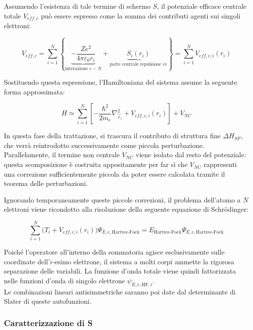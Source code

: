 Assumendo l'esistenza di tale termine di schermo \( S \), il potenziale efficace centrale totale \( V_{eff,c} \) può essere espresso come la somma dei contributi agenti sui singoli elettroni:

\begin{equation}
    V_{eff,c} = \sum_{i=1}^{N} \left\{ \underbrace{-\frac{Ze^2}{4\pi\varepsilon_0 r_i}}_{\text{interazione } e-N} + \underbrace{S_i(r_i)}_{\text{parte centrale repulsione } ee} \right\} = \sum_{i=1}^{N} V_{eff,c,i}(r_i)
\end{equation}

Sostituendo questa espressione, l'Hamiltoniana del sistema assume la seguente forma approssimata:

\begin{equation}
    H \simeq \sum_{i=1}^{N} \left[ -\frac{\hbar^2}{2m_e} \nabla_{\vec{r}_i}^2 + V_{eff,c,i}(r_i) \right] + V_{NC}
\end{equation}

In questa fase della trattazione, si trascura il contributo di struttura fine \( \Delta H_{SF} \), che verrà reintrodotto successivamente come piccola perturbazione. Parallelamente, il termine non centrale \( V_{NC} \) viene isolato dal resto del potenziale: questa scomposizione è costruita appositamente per far sì che \( V_{NC} \) rappresenti una correzione sufficientemente piccola da poter essere calcolata tramite il teorema delle perturbazioni.

Ignorando temporaneamente queste piccole correzioni, il problema dell'atomo a \( N \) elettroni viene ricondotto alla risoluzione della seguente equazione di Schrödinger:

\begin{equation}
    \sum_{i=1}^{N} \Big( T_i + V_{eff,c,i}(r_i) \Big) \Psi_{E,e,\text{Hartree-Fock}} = E_{\text{Hartree-Fock}} \Psi_{E,e,\text{Hartree-Fock}}
\end{equation}

Poiché l'operatore all'interno della sommatoria agisce esclusivamente sulle coordinate dell'\( i \)-esimo elettrone, il sistema a molti corpi ammette la rigorosa separazione delle variabili. 
La funzione d'onda totale viene quindi fattorizzata nelle funzioni d'onda di singolo elettrone \( \psi_{E,e,\text{HF},i} \).\\
Le combinazioni lineari antisimmetriche saranno poi date dal determinante di Slater di queste autofunzioni.

\subsubsection{Caratterizzazione di S}

